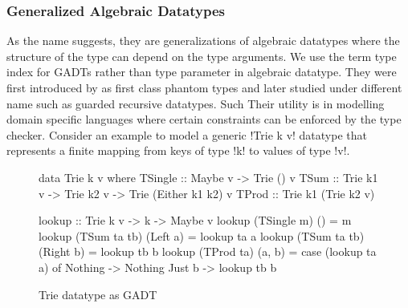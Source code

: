 \documentclass[manuscript,screen,nonacm]{acmart}
\begin{document}
\subsubsection{Generalized Algebraic Datatypes}
As the name suggests, they are generalizations of algebraic datatypes where the structure of the type can depend on the type arguments. We use the term type index for GADTs rather than type parameter in algebraic datatype. They were first introduced by \citep{cheney_first-class_2003} as first class phantom types and later studied under different name such as guarded recursive datatypes\cite{xi_guarded_2003}. Such Their utility is in modelling domain specific languages where certain constraints can be enforced by the type checker. Consider an example to model a generic !Trie k v! datatype that represents a finite mapping from keys of type !k! to values of type !v!.

\begin{figure}[ht]
  \centering
  \begin{minipage}[ht]{0.4\linewidth}
    \begin{code}
      data Trie k v where
          TSingle :: Maybe v -> Trie () v
          TSum    :: Trie k1 v -> Trie k2 v
                  -> Trie (Either k1 k2) v
          TProd   :: Trie k1 (Trie k2 v)



    \end{code}
  \end{minipage}%
  \begin{minipage}[ht]{0.5\linewidth}
    \begin{code}
      lookup :: Trie k v -> k -> Maybe v
      lookup (TSingle m) ()         = m
      lookup (TSum ta tb) (Left a)  = lookup ta a
      lookup (TSum ta tb) (Right b) = lookup tb b
      lookup (TProd ta) (a, b)      = case (lookup ta a) of
                                         Nothing -> Nothing
                                         Just b -> lookup tb b
    \end{code}
  \end{minipage}
  \caption{Trie datatype as GADT}
  \label{fig:gadt-example}
\end{figure}
\end{document}

